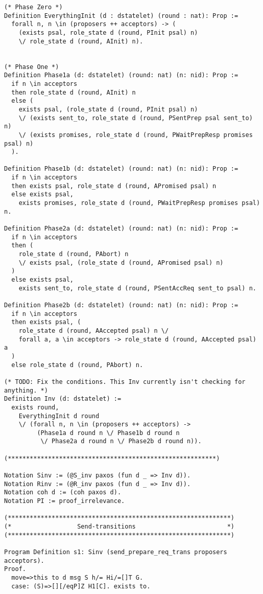 \begin{landscape}
\begin{multicols*}{2}
\begin{lstlisting}[style=SourceCodeListing]
(* Phase Zero *)
Definition EverythingInit (d : dstatelet) (round : nat): Prop :=
  forall n, n \in (proposers ++ acceptors) -> (
    (exists psal, role_state d (round, PInit psal) n)
    \/ role_state d (round, AInit) n).


(* Phase One *)
Definition Phase1a (d: dstatelet) (round: nat) (n: nid): Prop :=
  if n \in acceptors
  then role_state d (round, AInit) n
  else (
    exists psal, (role_state d (round, PInit psal) n)
    \/ (exists sent_to, role_state d (round, PSentPrep psal sent_to) n)
    \/ (exists promises, role_state d (round, PWaitPrepResp promises psal) n)
  ).

Definition Phase1b (d: dstatelet) (round: nat) (n: nid): Prop :=
  if n \in acceptors
  then exists psal, role_state d (round, APromised psal) n
  else exists psal,
    exists promises, role_state d (round, PWaitPrepResp promises psal) n.

Definition Phase2a (d: dstatelet) (round: nat) (n: nid): Prop :=
  if n \in acceptors
  then (
    role_state d (round, PAbort) n
    \/ exists psal, (role_state d (round, APromised psal) n)
  )
  else exists psal,
    exists sent_to, role_state d (round, PSentAccReq sent_to psal) n.

Definition Phase2b (d: dstatelet) (round: nat) (n: nid): Prop :=
  if n \in acceptors
  then exists psal, (
    role_state d (round, AAccepted psal) n \/
    forall a, a \in acceptors -> role_state d (round, AAccepted psal) a
  )
  else role_state d (round, PAbort) n.

(* TODO: Fix the conditions. This Inv currently isn't checking for anything. *)
Definition Inv (d: dstatelet) :=
  exists round,
    EverythingInit d round
    \/ (forall n, n \in (proposers ++ acceptors) ->
         (Phase1a d round n \/ Phase1b d round n
          \/ Phase2a d round n \/ Phase2b d round n)).

(*********************************************************)

Notation Sinv := (@S_inv paxos (fun d _ => Inv d)).
Notation Rinv := (@R_inv paxos (fun d _ => Inv d)).
Notation coh d := (coh paxos d).
Notation PI := proof_irrelevance.

(*************************************************************)
(*                  Send-transitions                         *)
(*************************************************************)

Program Definition s1: Sinv (send_prepare_req_trans proposers acceptors).
Proof.
  move=>this to d msg S h/= Hi/=[]T G.
  case: (S)=>[][/eqP]Z H1[C]. exists to.


\end{lstlisting}
\end{multicols*}
\end{landscape}
